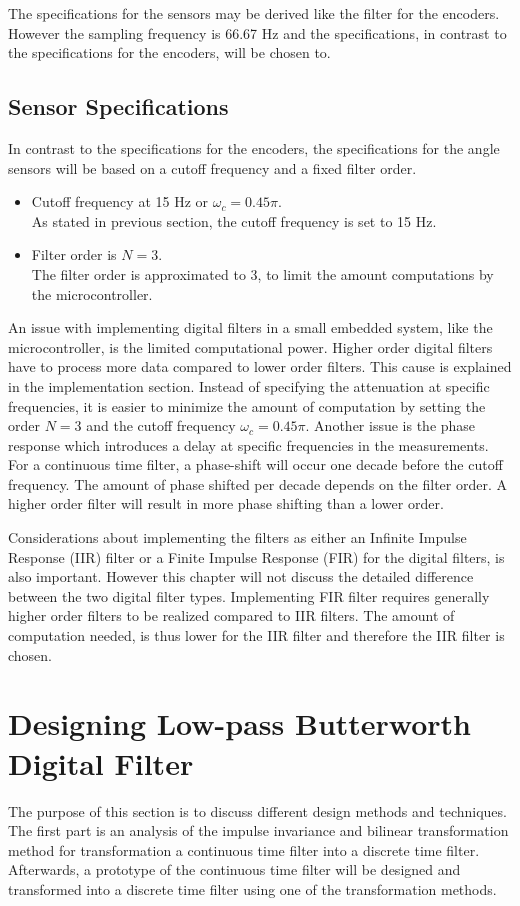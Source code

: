 The specifications for the sensors may be derived like the filter for the encoders. However the sampling frequency is 66.67 Hz and the specifications, in contrast to the specifications for the encoders, will be chosen to.
\subsection*{Sensor Specifications}
In contrast to the specifications for the encoders, the specifications for the angle sensors will be based on a cutoff frequency and a fixed filter order.
\begin{itemize}
\item Cutoff frequency at 15 Hz or $\omega_c = 0.45 \pi$. \\
As stated in previous section, the cutoff frequency is set to 15 Hz. 
\item Filter order is $N = 3$. \\
The filter order is approximated to 3, to limit the amount computations by the microcontroller.
\end{itemize}

An issue with implementing digital filters in a small embedded system, like the microcontroller, is the limited computational power. Higher order digital filters have to process more data compared to lower order filters. This cause is explained in the implementation section. Instead of specifying the attenuation at specific frequencies, it is easier to minimize the amount of computation by setting the order $N=3$ and the cutoff frequency $\omega_c = 0.45 \pi$. Another issue is the phase response which introduces a delay at specific frequencies in the measurements. For a continuous time filter, a phase-shift will occur one decade before the cutoff frequency. The amount of phase shifted per decade depends on the filter order. A higher order filter will result in more phase shifting than a lower order.

Considerations about implementing the filters as either an Infinite Impulse Response (IIR) filter or a Finite Impulse Response (FIR) for the digital filters, is also important. However this chapter will not discuss the detailed difference between the two digital filter types. Implementing FIR filter requires generally higher order filters to be realized compared to IIR filters\citep{iir_vs_fir}. The amount of computation needed, is thus lower for the IIR filter and therefore the IIR filter is chosen.

\section{Designing Low-pass Butterworth Digital Filter}
The purpose of this section is to discuss different design methods and techniques. The first part is an analysis of the impulse invariance and bilinear transformation method for transformation a continuous time filter into a discrete time filter. Afterwards, a prototype of the continuous time filter will be designed and transformed into a discrete time filter using one of the transformation methods.

